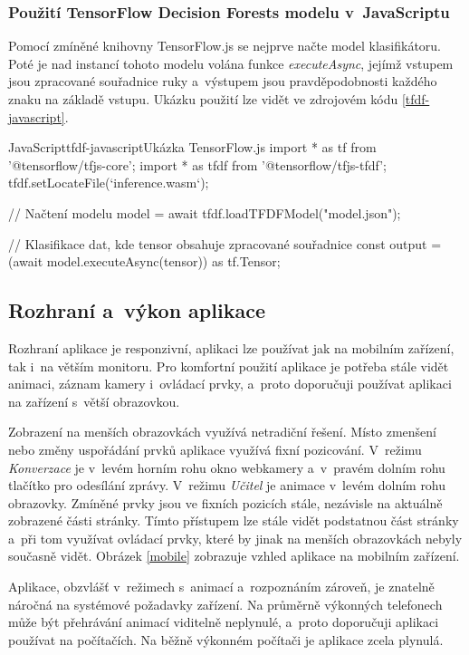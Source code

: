 \documentclass[
  master,
  program=ainfvs,
  biblatex,
  figures=true,
  tables=false,
  sourcecodes=true,
  glossaries,
  index
]{kidiplom}
\begin{document}
    
        \subsubsection{Použití TensorFlow Decision Forests modelu v~JavaScriptu}
            Pomocí zmíněné knihovny TensorFlow.js se nejprve načte model klasifikátoru. Poté je nad instancí tohoto modelu volána funkce \emph{executeAsync}, jejímž vstupem jsou zpracované souřadnice ruky a~výstupem jsou pravděpodobnosti každého znaku na základě vstupu. Ukázku použití lze vidět ve zdrojovém kódu \ref{tfdf-javascript}.

            \begin{kicode}{JavaScript}{tfdf-javascript}{Ukázka TensorFlow.js}
import * as tf from '@tensorflow/tfjs-core';
import * as tfdf from '@tensorflow/tfjs-tfdf';
tfdf.setLocateFile(`inference.wasm`);

// Načtení modelu
model = await tfdf.loadTFDFModel("model.json");

// Klasifikace dat, kde tensor obsahuje zpracované souřadnice
const output = (await model.executeAsync(tensor)) as tf.Tensor;
            \end{kicode}

    
    \subsection{Rozhraní a~výkon aplikace}
        Rozhraní aplikace je responzivní, aplikaci lze používat jak na mobilním zařízení, tak i~na větším monitoru. Pro komfortní použití aplikace je potřeba stále vidět animaci, záznam kamery i~ovládací prvky, a~proto doporučuji používat aplikaci na zařízení s~větší obrazovkou.

        Zobrazení na menších obrazovkách využívá netradiční řešení. Místo zmenšení nebo změny uspořádání prvků aplikace využívá fixní pozicování. V~režimu \emph{Konverzace} je v~levém horním rohu okno webkamery a~v~pravém dolním rohu tlačítko pro odesílání zprávy. V~režimu \emph{Učitel} je animace v~levém dolním rohu obrazovky. Zmíněné prvky jsou ve fixních pozicích stále, nezávisle na aktuálně zobrazené části stránky. Tímto přístupem lze stále vidět podstatnou část stránky a~při tom využívat ovládací prvky, které by jinak na menších obrazovkách nebyly současně vidět. Obrázek \ref{mobile} zobrazuje vzhled aplikace na mobilním zařízení.

        Aplikace, obzvlášť v~režimech s~animací a~rozpoznáním zároveň, je znatelně náročná na systémové požadavky zařízení. Na průměrně výkonných telefonech může být přehrávání animací viditelně neplynulé, a~proto doporučuji aplikaci používat na počítačích. Na běžně výkonném počítači je aplikace zcela plynulá.
\end{document}
